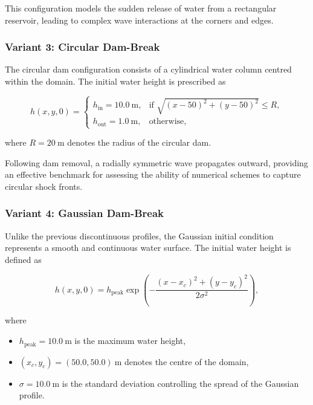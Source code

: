 \documentclass[12pt]{article}
\begin{document}
This configuration models the sudden release of water from a rectangular reservoir, leading to complex wave interactions at the corners and edges.

\subsubsection{Variant 3: Circular Dam-Break}

The circular dam configuration consists of a cylindrical water column centred within the domain. The initial water height is prescribed as

\begin{equation}
h(x,y,0)=
\begin{cases}
h_{\mathrm{in}}=10.0~\mathrm{m},
& \text{if }
\sqrt{(x-50)^2+(y-50)^2}\leq R,\\
h_{\mathrm{out}}=1.0~\mathrm{m},
& \text{otherwise},
\end{cases}
\end{equation}

where $R=20~\mathrm{m}$ denotes the radius of the circular dam.

Following dam removal, a radially symmetric wave propagates outward, providing an effective benchmark for assessing the ability of numerical schemes to capture circular shock fronts.

\subsubsection{Variant 4: Gaussian Dam-Break}

Unlike the previous discontinuous profiles, the Gaussian initial condition represents a smooth and continuous water surface. The initial water height is defined as

\begin{equation}
h(x,y,0)
=
h_{\mathrm{peak}}
\exp\left(
-\frac{(x-x_c)^2+(y-y_c)^2}
{2\sigma^2}
\right),
\end{equation}

where

\begin{itemize}
\item $h_{\mathrm{peak}}=10.0~\mathrm{m}$ is the maximum water height,
\item $(x_c,y_c)=(50.0,50.0)~\mathrm{m}$ denotes the centre of the domain,
\item $\sigma=10.0~\mathrm{m}$ is the standard deviation controlling the spread of the Gaussian profile.
\end{itemize}
\end{document}
